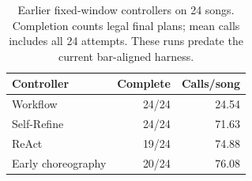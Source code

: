 \begin{table}[t]
\centering
\caption{Earlier fixed-window controllers on 24 songs. Completion counts
legal final plans; mean calls includes all 24 attempts. These runs
predate the current bar-aligned harness.}
\label{tab:harness-controller-history}
\begingroup\footnotesize
\setlength{\tabcolsep}{4pt}
\renewcommand{\arraystretch}{1.08}
\begin{tabular*}{\columnwidth}{@{\extracolsep{\fill}}lrr@{}}
\toprule
Controller & Complete & Calls/song \\
\midrule
Workflow & 24/24 & 24.54 \\
Self-Refine & 24/24 & 71.63 \\
ReAct & 19/24 & 74.88 \\
Early choreography & 20/24 & 76.08 \\
\bottomrule
\end{tabular*}
\endgroup
\end{table}
